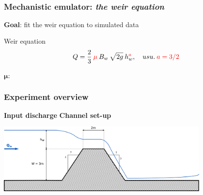 \documentclass[xcolor=dvipsnames, USenglish]{beamer}  %
\begin{document}
  \begin{frame}
    \frametitle{Mechanistic emulator: \emph{the weir equation}}
    \textbf{Goal}: fit the weir equation to simulated data\\
    \vfill
    \begin{alertblock}{Weir equation}
      \setlength\abovedisplayskip{0pt}
      \begin{equation*}
        Q = \frac{2}{3}\: \textcolor{red}{\mu}\: B_w\: \sqrt{2g}\: h_w^{\textcolor{red}{a}},
        \quad usu.\: \textcolor{red}{a = 3/2}
      \end{equation*}
    \end{alertblock}
    \vfill
    \centering
    $\boldsymbol{\mu :\,}$ 
  \end{frame}


  \begin{frame}
    \frametitle{Experiment overview}
    \textbf{Input discharge}
    \QinCode
    \vfill
    \textbf{Channel set-up}

    \centering
    \includegraphics[width=0.8\textwidth]{img/weir.png}
  \end{frame}
\end{document}

